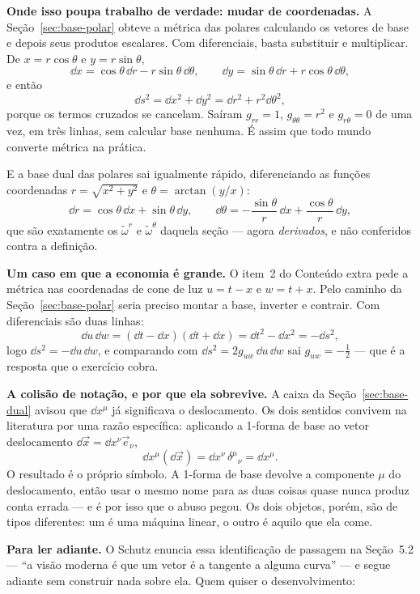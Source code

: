 \documentclass[12pt,a4paper,oneside]{book}
\theoremstyle{rgplain}
\theoremstyle{rgremark}
\begin{document}
\begin{leitura}[title={\sffamily\bfseries\footnotesize\color{rgPetroClaro}LEITURA EXTRA\hspace{0.7em}\textbullet\hspace{0.7em}VETORES SÃO DERIVADAS, 1-FORMAS SÃO DIFERENCIAIS}]
\medskip
\textbf{Onde isso poupa trabalho de verdade: mudar de coordenadas.} A
Seção~\ref{sec:base-polar} obteve a métrica das polares calculando os vetores
de base e depois seus produtos escalares. Com diferenciais, basta substituir e
multiplicar. De $x=r\cos\theta$ e $y=r\sin\theta$,
\[
  \dd x=\cos\theta\,\dd r-r\sin\theta\,\dd\theta,
  \qquad
  \dd y=\sin\theta\,\dd r+r\cos\theta\,\dd\theta,
\]
e então
\[
  \dd s^2=\dd x^2+\dd y^2=\dd r^2+r^2\dd\theta^2 ,
\]
porque os termos cruzados se cancelam. Saíram $g_{rr}=1$, $g_{\theta\theta}=r^2$
e $g_{r\theta}=0$ de uma vez, em três linhas, sem calcular base nenhuma. É
assim que todo mundo converte métrica na prática.

E a base dual das polares sai igualmente rápido, diferenciando as funções
coordenadas $r=\sqrt{x^2+y^2}$ e $\theta=\arctan(y/x)$:
\[
  \dd r=\cos\theta\,\dd x+\sin\theta\,\dd y,
  \qquad
  \dd\theta=-\frac{\sin\theta}{r}\,\dd x+\frac{\cos\theta}{r}\,\dd y ,
\]
que são exatamente os $\tilde\omega^r$ e $\tilde\omega^\theta$ daquela seção ---
agora \emph{derivados}, e não conferidos contra a definição.

\medskip
\textbf{Um caso em que a economia é grande.} O item~2 do Conteúdo extra pede a
métrica nas coordenadas de cone de luz $u=t-x$ e $w=t+x$. Pelo caminho da
Seção~\ref{sec:base-polar} seria preciso montar a base, inverter e contrair.
Com diferenciais são duas linhas:
\[
  \dd u\,\dd w=(\dd t-\dd x)(\dd t+\dd x)=\dd t^2-\dd x^2=-\dd s^2 ,
\]
logo $\dd s^2=-\dd u\,\dd w$, e comparando com
$\dd s^2=2g_{uw}\,\dd u\,\dd w$ sai $g_{uw}=-\tfrac12$ --- que é a resposta que
o exercício cobra.

\medskip
\textbf{A colisão de notação, e por que ela sobrevive.} A caixa da
Seção~\ref{sec:base-dual} avisou que $\dd x^\mu$ já significava o deslocamento.
Os dois sentidos convivem na literatura por uma razão específica: aplicando a
1-forma de base ao vetor deslocamento $\dd\vec x=\dd x^\nu\vec e_\nu$,
\[
  \dd x^\mu(\dd\vec x)=\dd x^\nu\,\delta^\mu{}_\nu=\dd x^\mu .
\]
O resultado é o próprio símbolo. A 1-forma de base devolve a componente
$\mu$ do deslocamento, então usar o mesmo nome para as duas coisas quase nunca
produz conta errada --- e é por isso que o abuso pegou. Os dois objetos, porém,
são de tipos diferentes: um é uma máquina linear, o outro é aquilo que ela come.

\medskip
\textbf{Para ler adiante.} O Schutz enuncia essa identificação de passagem na
Seção~5.2 --- ``a visão moderna é que um vetor é a tangente a alguma curva'' ---
e segue adiante sem construir nada sobre ela. Quem quiser o desenvolvimento:


\end{leitura}
\end{document}
